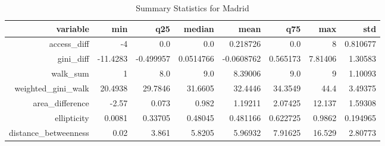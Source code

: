 \begin{table}
  \caption{Summary Statistics for Madrid}
  \begin{tabular}{rrrrrrrr}
    \hline
    \textbf{variable} & \textbf{min} & \textbf{q25} & \textbf{median} & \textbf{mean} & \textbf{q75} & \textbf{max} & \textbf{std} \\\hline
    access\_diff & -4 & 0.0 & 0.0 & 0.218726 & 0.0 & 8 & 0.810677 \\
    gini\_diff & -11.4283 & -0.499957 & 0.0514766 & -0.0608762 & 0.565173 & 7.81406 & 1.30583 \\
    walk\_sum & 1 & 8.0 & 9.0 & 8.39006 & 9.0 & 9 & 1.10093 \\
    weighted\_gini\_walk & 20.4938 & 29.7846 & 31.6605 & 32.4446 & 34.3549 & 44.4 & 3.49375 \\
    area\_difference & -2.57 & 0.073 & 0.982 & 1.19211 & 2.07425 & 12.137 & 1.59308 \\
    ellipticity & 0.0081 & 0.33705 & 0.48045 & 0.481166 & 0.622725 & 0.9862 & 0.194965 \\
    distance\_betweenness & 0.02 & 3.861 & 5.8205 & 5.96932 & 7.91625 & 16.529 & 2.80773 \\\hline
  \end{tabular}
  \label{tab:madrid_stats}
\end{table}
